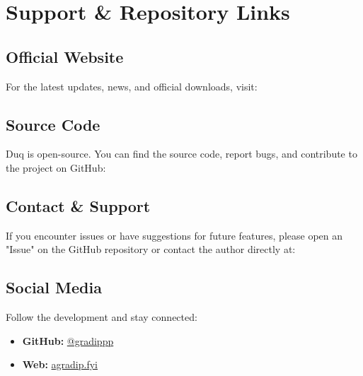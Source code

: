 \chapter{Support \& Repository Links}
\label{ch:support_links}

\section{Official Website}
For the latest updates, news, and official downloads, visit: \\
\href{\projecturl}{\projecturl}

\section{Source Code}
Duq is open-source. You can find the source code, report bugs, and contribute to the project on GitHub: \\
\href{\githuburl}{\githuburl}

\section{Contact \& Support}
If you encounter issues or have suggestions for future features, please open an "Issue" on the GitHub repository or contact the author directly at: \\
\href{mailto:\authoremail}{\authoremail}

\section{Social Media}
Follow the development and stay connected:
\begin{itemize}
    \item \textbf{GitHub:} \href{https://github.com/gradippp}{@gradippp}
    \item \textbf{Web:} \href{https://agradip.fyi}{agradip.fyi}
\end{itemize}
